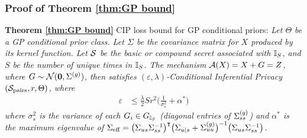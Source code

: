 \subsubsection{Proof of Theorem \ref{thm:GP bound}}
\label{apx: GP bound proof}
\textbf{Theorem \ref{thm:GP bound}}
CIP loss bound for GP conditional priors:
\emph{
Let $\Theta$ be a GP conditional prior class. Let $\Sigma$ be the covariance matrix for $X$ produced by its kernel function. Let $\mathcal{S}$ be the basic or compound secret associated with ${\mathbb{I}_S}$, and $S$ be the number of unique times in ${\mathbb{I}_S}$. The mechanism $\mathcal{A}(X) = X + G = Z$, where $G \sim \mathcal{N}(\mathbf{0}, \Sigma^{(g)})$, then satisfies $(\varepsilon, \lambda)$-Conditional Inferential Privacy $(\mathcal{S}_{\text{pairs}}, r, \Theta)$, where 
\begin{align*}
	\varepsilon
	&\leq \frac{\lambda}{2} S r^2 \Big(  \frac{1 }{\sigma_s^2} + \alpha^*  \Big) 
\end{align*}
where $\sigma_s^2$ is the variance of each $G_i \in {G_{\mathbb{I}_S}}$ (diagonal entries of $\Sigma^{(g)}_{ss}$) and $\alpha^*$ is the maximum eigenvalue of $\Sigma_{\text{eff}} = \big(\Sigma_{us} \Sigma_{ss}^{-1}\big)^\intercal \big( \Sigma_{u | s} + \Sigma_{uu}^{(g)} \big)^{-1} \big(\Sigma_{us} \Sigma_{ss}^{-1}\big)$. 
}

